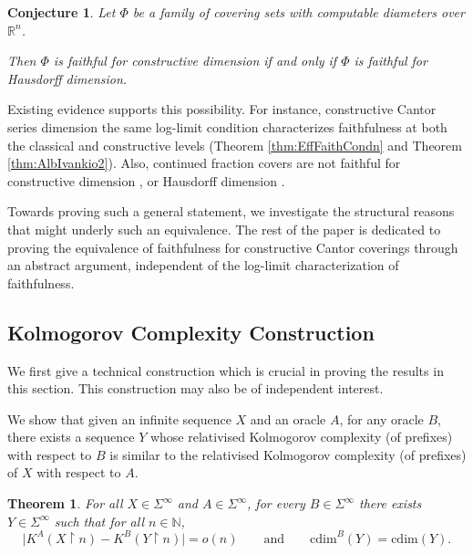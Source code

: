 \documentclass[11pt]{article}
\newtheorem{theorem}{Theorem}
\newtheorem{conjecture}{Conjecture}
\newcommand{\R}{\mathbb{R}}
\newcommand{\cdim}{\mathrm{cdim}}
\begin{document}
\begin{conjecture} \label{conj}
	Let $\Phi$ be a family of covering sets with computable diameters over $\R^n$. 
	
	Then $\Phi$ is  faithful for constructive dimension if and only if $\Phi$ is faithful for Hausdorff dimension.
\end{conjecture}

 Existing evidence supports this possibility. 
 For instance, constructive Cantor series dimension the same log-limit condition characterizes faithfulness at both the classical and constructive levels (Theorem \ref{thm:EffFaithCondn} and Theorem \ref{thm:AlbIvankio2}).
 Also, continued fraction covers are not faithful for constructive dimension \cite{Nandakumar2023b}, or Hausdorff dimension \cite{PeresTorbin}. 
 
 Towards proving such a general statement, we investigate the structural reasons that might underly such an equivalence. The rest of the paper is dedicated to proving the equivalence of faithfulness for constructive Cantor coverings through an abstract argument, independent of the log-limit characterization of faithfulness.

\subsection{Kolmogorov Complexity Construction} \label{sec:KCConstrn}
We first give a technical construction which is crucial in proving the results in this section. This construction may also be of independent interest.

We show that given an infinite sequence $X$ and an oracle $A$, for any oracle $B$, there exists a sequence $Y$ whose relativised Kolmogorov complexity (of prefixes) with respect to $B$ is similar to the relativised Kolmogorov complexity (of prefixes) of $X$ with respect to $A$. 

\begin{theorem}\label{thm:KCChasinglemma}
	For all $X\in\Sigma^\infty$ and $A\in\Sigma^\infty$, for every $B\in\Sigma^\infty$ there exists $Y\in\Sigma^\infty$ such that for all $n\in\mathbb N$,
	\[
	\bigl|K^{A}(X\upharpoonright n)-K^{B}(Y\upharpoonright n)\bigr|=o(n)
	\qquad\text{and}\qquad
	\cdim^{B}(Y)=\cdim(Y).
	\]
\end{theorem}
\end{document}
